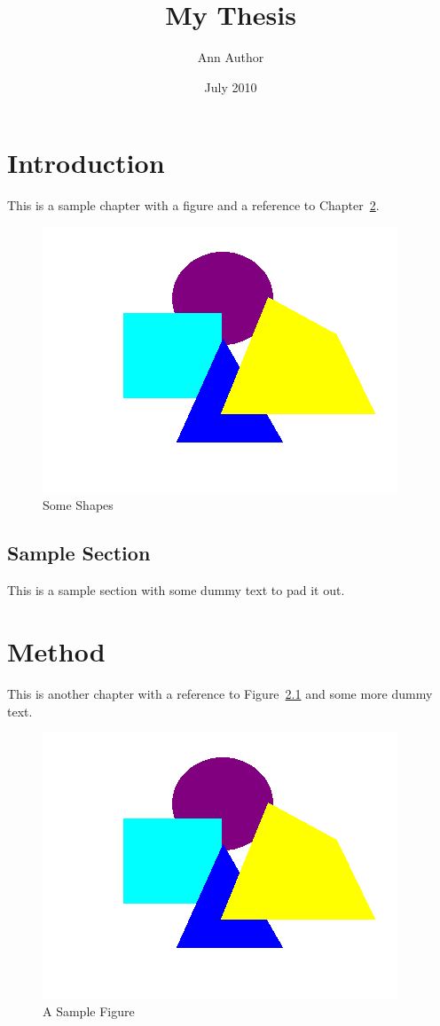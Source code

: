 \documentclass[oneside,numbers=noenddot]{scrbook}
\title{My Thesis}
\author{Ann Author}
\date{July 2010}
\begin{document}
\maketitle

\chapter{Introduction}

This is a sample chapter with a figure and a reference to Chapter~\ref{ch:method}.

\begin{figure}[htbp]
\centering
\includegraphics{shapes}
\caption{Some Shapes}
\end{figure}

\section{Sample Section}

This is a sample section with some dummy text to pad it out. \lipsum

\chapter{Method}\label{ch:method}

This is another chapter with a reference to Figure~\ref{fig:shapes}
and some more dummy text.

\begin{figure}[htbp]
\centering
\includegraphics[scale=0.5,angle=45]{shapes}
\caption{A Sample Figure}\label{fig:shapes}
\end{figure}
\end{document}
